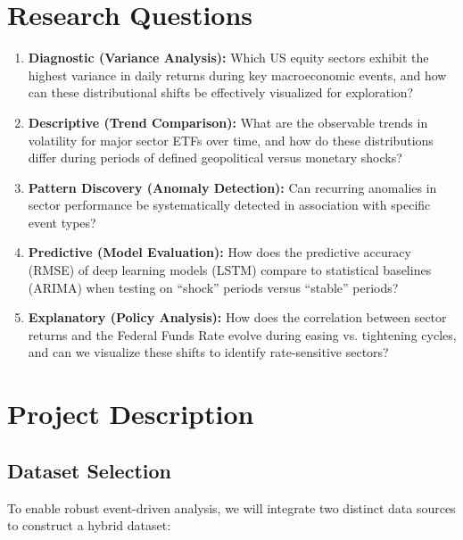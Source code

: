 \documentclass{article}
\begin{document}
\section{Research Questions}
\begin{enumerate}
    \item \textbf{Diagnostic (Variance Analysis):} Which US equity sectors exhibit the highest variance in daily returns during key macroeconomic events, and how can these distributional shifts be effectively visualized for exploration?
    
    \item \textbf{Descriptive (Trend Comparison):} What are the observable trends in volatility for major sector ETFs over time, and how do these distributions differ during periods of defined geopolitical versus monetary shocks?
    
    \item \textbf{Pattern Discovery (Anomaly Detection):} Can recurring anomalies in sector performance be systematically detected in association with specific event types?
    
    \item \textbf{Predictive (Model Evaluation):} How does the predictive accuracy (RMSE) of deep learning models (LSTM) compare to statistical baselines (ARIMA) when testing on ``shock'' periods versus ``stable'' periods?
    
    \item \textbf{Explanatory (Policy Analysis):} How does the correlation between sector returns and the Federal Funds Rate evolve during easing vs. tightening cycles, and can we visualize these shifts to identify rate-sensitive sectors?
\end{enumerate}

\section{Project Description}

\subsection{Dataset Selection}
To enable robust event-driven analysis, we will integrate two distinct data sources to construct a hybrid dataset:
\end{document}
